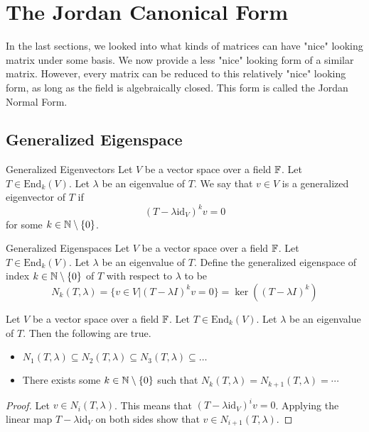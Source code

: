 \documentclass[a4paper]{article}
\begin{document}
\pagebreak
\section{The Jordan Canonical Form}
In the last sections, we looked into what kinds of matrices can have "nice" looking matrix under some basis. We now provide a less "nice" looking form of a similar matrix. However, every matrix can be reduced to this relatively "nice" looking form, as long as the field is algebraically closed. This form is called the Jordan Normal Form. 

\subsection{Generalized Eigenspace}
\begin{defn}{Generalized Eigenvectors}{} Let $V$ be a vector space over a field $\mathbb{F}$. Let $T\in\text{End}_k(V)$. Let $\lambda$ be an eigenvalue of $T$. We say that $v\in V$ is a generalized eigenvector of $T$ if $$(T-\lambda\text{id}_V)^kv=0$$ for some $k\in\mathbb{N}\setminus\{0\}$. 
\end{defn}

\begin{defn}{Generalized Eigenspaces}{} Let $V$ be a vector space over a field $\mathbb{F}$. Let $T\in\text{End}_k(V)$. Let $\lambda$ be an eigenvalue of $T$. Define the generalized eigenspace of index $k\in\mathbb{N}\setminus\{0\}$ of $T$ with respect to $\lambda$ to be $$N_k(T,\lambda)=\{v\in V|(T-\lambda I)^kv=0\}=\ker((T-\lambda I)^k)$$
\end{defn}

\begin{prp}{}{} Let $V$ be a vector space over a field $\mathbb{F}$. Let $T\in\text{End}_k(V)$. Let $\lambda$ be an eigenvalue of $T$. Then the following are true. 
\begin{itemize}
\item $N_1(T,\lambda)\subseteq N_2(T,\lambda)\subseteq N_3(T,\lambda)\subseteq\dots$
\item There exists some $k\in\mathbb{N}\setminus\{0\}$ such that $N_k(T,\lambda)=N_{k+1}(T,\lambda)=\cdots$
\end{itemize} \tcbline
\begin{proof}
Let $v\in N_i(T,\lambda)$. This means that $(T-\lambda\text{id}_V)^iv=0$. Applying the linear map $T-\lambda\text{id}_V$ on both sides show that $v\in N_{i+1}(T,\lambda)$. 
\end{proof}
\end{prp}
\end{document}
